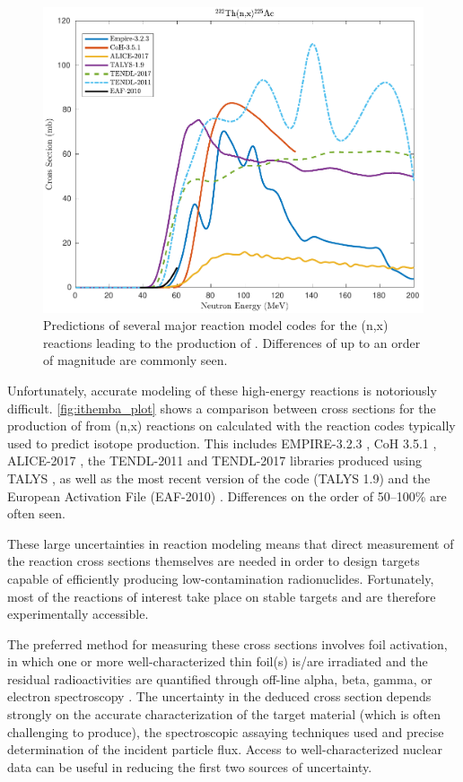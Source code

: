 \documentclass[letterpaper]{ar-1col}
\begin{document}
\begin{figure}
 \centering
 \includegraphics[width=0.7\linewidth]{225Ac.pdf}

 \caption{Predictions of several major reaction model codes for the (n,x) reactions leading to the production of .  Differences of up to an order of magnitude are commonly seen.    }
 \label{fig:ithemba_plot}
\end{figure}

Unfortunately, accurate modeling of these high-energy reactions is notoriously difficult.
 \autoref{fig:ithemba_plot} shows a comparison between cross sections for the production of  from (n,x) reactions on  calculated with the reaction codes typically used to predict isotope production.
 This includes EMPIRE-3.2.3 \cite{Herman2013}, CoH 3.5.1 \cite{KAWANO2010}, ALICE-2017 \cite{Blann1996}, the TENDL-2011 and TENDL-2017 libraries produced using TALYS \cite{Rochman2017}, as well as the most recent version of the code (TALYS 1.9) \cite{Koning2012} and the European Activation File (EAF-2010) \cite{Forrest2005}.
 Differences on the order of 50--100\% are often seen.
 

These large uncertainties in reaction modeling means that direct measurement of the reaction cross sections themselves are needed in order to design targets capable of efficiently producing low-contamination radionuclides.
 Fortunately, most of the reactions of interest take place on stable targets and are therefore experimentally accessible.


The preferred method for measuring these cross sections involves foil activation, in which one or more well-characterized thin foil(s) is/are irradiated and the residual radioactivities are quantified through off-line alpha, beta, gamma, or electron spectroscopy \cite{Voyles2018a,Graves2016}.
 The uncertainty in the deduced cross section depends strongly on the accurate characterization of the target material (which is often challenging to produce), the spectroscopic assaying techniques used and precise determination of the incident particle flux.
Access to well-characterized nuclear data can be useful in reducing the first two sources of uncertainty.
\end{document}
